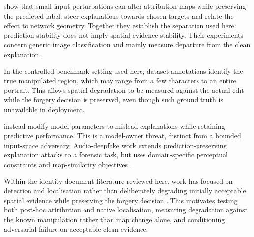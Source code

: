 \citet{ghorbani2019fragile} show that small input perturbations can alter attribution maps while preserving the predicted label. \citet{dombrowski2019explanations} steer explanations towards chosen targets and relate the effect to network geometry. Together they establish the separation used here: prediction stability does not imply spatial-evidence stability. Their experiments concern generic image classification and mainly measure departure from the clean explanation. 

In the controlled benchmark setting used here, dataset annotations identify the true manipulated region, which may range from a few characters to an entire portrait. This allows spatial degradation to be measured against the actual edit while the forgery decision is preserved, even though such ground truth is unavailable in deployment.

\citet{heo2019fooling} instead modify model parameters to mislead explanations while retaining predictive performance. This is a model-owner threat, distinct from a bounded input-space adversary. Audio-deepfake work extends prediction-preserving explanation attacks to a forensic task, but uses domain-specific perceptual constraints and map-similarity objectives \citep{kitlowski2026fragility}.

Within the identity-document literature reviewed here, work has focused on detection and localisation rather than deliberately degrading initially acceptable spatial evidence while preserving the forgery decision \citep{korshunov2025fantasyid,korshunov2025deepid,kumar2026flid}. This motivates testing both post-hoc attribution and native localisation, measuring degradation against the known manipulation rather than map change alone, and conditioning adversarial failure on acceptable clean evidence.

